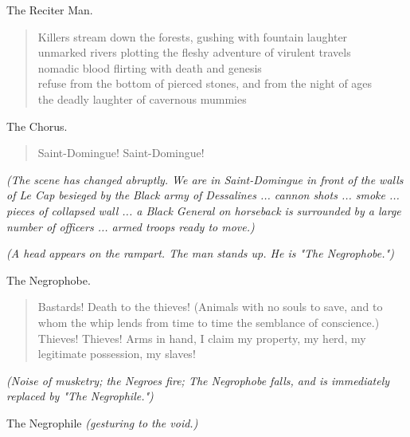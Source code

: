 \documentclass[letterpaper,article,12pt,oneside,notitlepage]{memoir}
\begin{document}
\begin{center}The Reciter Man.\end{center}

\begin{verse}
\hspace{1cm} Killers stream down the forests, gushing with fountain laughter \\
unmarked rivers plotting the fleshy adventure of virulent travels \\
nomadic blood flirting with death and genesis \\
refuse from the bottom of pierced stones, and from the night of ages \\
the deadly laughter of cavernous mummies \\
\end{verse}

\begin{center}The Chorus.\end{center}

\begin{verse}
Saint-Domingue! Saint-Domingue! \\
\end{verse}

\textit{(The scene has changed abruptly. We are in Saint-Domingue in front of the walls of Le Cap besieged by the Black army of Dessalines ... cannon shots ... smoke ... pieces of collapsed wall ... a Black General on horseback is surrounded by a large number of officers ... armed troops ready to move.)}

\vspace{\baselineskip}

\textit{(A head appears on the rampart. The man stands up. He is "The Negrophobe.")}

\begin{center}The Negrophobe.\end{center}

\begin{verse}
Bastards! Death to the thieves! (Animals with no souls to save, and to whom the whip lends from time to time the semblance of conscience.) Thieves! Thieves! Arms in hand, I claim my property, my herd, my legitimate possession, my slaves!  \\
\end{verse}

\textit{(Noise of musketry; the Negroes fire; The Negrophobe falls, and is immediately replaced by "The Negrophile.")}

\begin{center}The Negrophile \textit{(gesturing to the void.)}\end{center}
\end{document}
